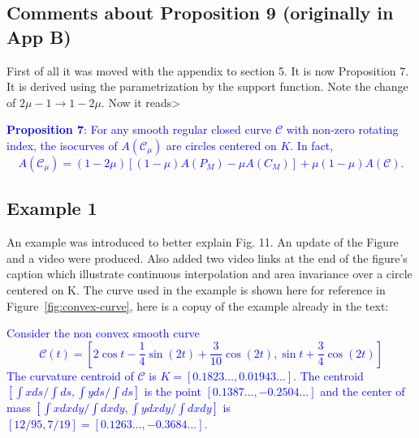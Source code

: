 \subsection{Comments about Proposition 9 (originally in App B)}
  
First of all it was moved with the appendix to section 5. It is now Proposition 7. It is derived using the parametrization by the support function. Note the change of $2 \mu-1 \rightarrow  1-2\mu$. Now it reads>
 
 \textcolor{blue}{\textbf{Proposition 7}: For any smooth regular closed curve $\mathcal{C}$ with non-zero rotating index, the isocurves of $A(\mathcal{C}_\mu)$ are circles centered on $K$.
In fact, \[A(\mathcal{C}_\mu) =(1-2\mu)[(1-\mu) A(P_M)-\mu A(C_M)]+\mu(1-\mu)A(\mathcal{C}).\] 
 }

\subsection{Example 1 }
An example was introduced to better explain Fig. 11. An update of the   Figure  and a video were produced. Also added two video links at the end of the figure's caption which illustrate continuous interpolation and area invariance over a circle centered on K. The curve used in the example is shown here for reference in Figure~\ref{fig:convex-curve}, here is a copuy of the example already in the text:

\textcolor{blue}{
  Consider the non convex smooth curve 
\[ 
\mathcal{C}(t)= [  2 \cos t -\frac{1}{4}\sin( 2t) + \frac{3}{10}\cos(2t),
\sin{t} + \frac{3}{4}\cos(2t)] \] 
The curvature centroid of $\mathcal{C}$ is $K=[0.1823\ldots, 0.01943\ldots]$. The  centroid
$[\int xds/\int ds, \int yds/\int ds]$ is the point $[0.1387\ldots, -0.2504\ldots ] $ and the center of mass $[\int xdxdy/\int dxdy, \int ydxdy/\int dxdy]$ is $[12/95, 7/19]=[0.1263\ldots, -0.3684\ldots]$.
}

